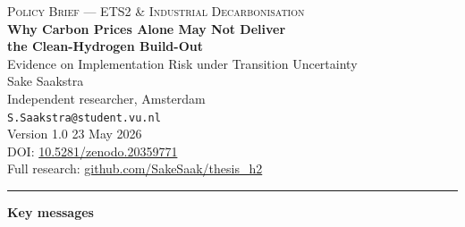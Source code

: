 \documentclass[11pt,a4paper]{article}
\begin{document}
\thispagestyle{empty}

\begin{center}
{\small\textsc{Policy Brief --- ETS2 \& Industrial Decarbonisation}} \\[0.6em]
{\Large\bfseries Why Carbon Prices Alone May Not Deliver} \\[0.2em]
{\Large\bfseries the Clean-Hydrogen Build-Out} \\[0.7em]
{\large Evidence on Implementation Risk under Transition Uncertainty} \\[1.2em]

Sake Saakstra \\
Independent researcher, Amsterdam \\
\texttt{S.Saakstra@student.vu.nl} \\[0.4em]

Version 1.0 \textbar{} 23 May 2026 \\
DOI: \href{https://doi.org/10.5281/zenodo.20359771}{10.5281/zenodo.20359771} \\
Full research: \href{https://github.com/SakeSaak/thesis_h2}{github.com/SakeSaak/thesis\_h2}
\end{center}

\vspace{0.6em}

\medskip
\hrule
\vspace{0.4em}
\textbf{Key messages}
\end{document}

